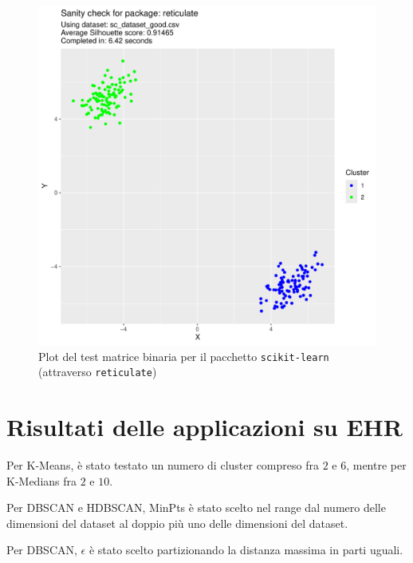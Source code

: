 \documentclass[12pt]{report}
\begin{document}
			\begin{figure}[h]
				\includegraphics[width = \textwidth, page = 3]{results/results_RETICULATE.pdf}
				\caption{Plot del test matrice binaria per il pacchetto
				\texttt{scikit-learn} (attraverso \texttt{reticulate})}
				\label{fig:reticulatebm}
			\end{figure}

		\section{Risultati delle applicazioni su EHR}

			Per K-Means, è stato testato un numero di cluster compreso fra $2$ e
			$6$, mentre per K-Medians fra $2$ e $10$.

			Per DBSCAN e HDBSCAN, MinPts è stato scelto nel range dal numero delle
			dimensioni del dataset al doppio più uno delle dimensioni del dataset.

			Per DBSCAN, $\epsilon$ è stato scelto partizionando la distanza massima
			in parti uguali.
\end{document}
